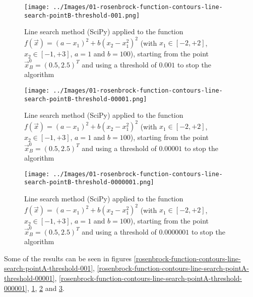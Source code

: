         \begin{figure}
            \centering
            \texttt{[image: ../Images/01-rosenbrock-function-contours-line-search-pointB-threshold-001.png]}
            \caption{Line search method (SciPy) applied to the function \(f(\vec{x}) = (a - x_1)^2 + b(x_2 - x_1^2)^2\) (with \(x_1 \in [-2, +2]\), \(x_2 \in [-1, +3]\), \(a=1\) and \(b=100\)), starting from the point \(\vec{x}_B^0 = (0.5, 2.5)^T\) and using a threshold of \(0.001\) to stop the algorithm}
            \label{rosenbrock-function-contours-line-search-pointB-threshold-001}
        \end{figure}
        \begin{figure}
            \centering
            \texttt{[image: ../Images/01-rosenbrock-function-contours-line-search-pointB-threshold-00001.png]}
            \caption{Line search method (SciPy) applied to the function \(f(\vec{x}) = (a - x_1)^2 + b(x_2 - x_1^2)^2\) (with \(x_1 \in [-2, +2]\), \(x_2 \in [-1, +3]\), \(a=1\) and \(b=100\)), starting from the point \(\vec{x}_B^0 = (0.5, 2.5)^T\) and using a threshold of \(0.00001\) to stop the algorithm}
            \label{rosenbrock-function-contours-line-search-pointB-threshold-00001}
        \end{figure}
        \begin{figure}
            \centering
            \texttt{[image: ../Images/01-rosenbrock-function-contours-line-search-pointB-threshold-0000001.png]}
            \caption{Line search method (SciPy) applied to the function \(f(\vec{x}) = (a - x_1)^2 + b(x_2 - x_1^2)^2\) (with \(x_1 \in [-2, +2]\), \(x_2 \in [-1, +3]\), \(a=1\) and \(b=100\)), starting from the point \(\vec{x}_B^0 = (0.5, 2.5)^T\) and using a threshold of \(0.0000001\) to stop the algorithm}
            \label{rosenbrock-function-contours-line-search-pointB-threshold-000001}
        \end{figure}
        Some of the results can be seen in figures \ref{rosenbrock-function-contours-line-search-pointA-threshold-001}, \ref{rosenbrock-function-contours-line-search-pointA-threshold-00001}, \ref{rosenbrock-function-contours-line-search-pointA-threshold-000001}, \ref{rosenbrock-function-contours-line-search-pointB-threshold-001}, \ref{rosenbrock-function-contours-line-search-pointB-threshold-00001} and \ref{rosenbrock-function-contours-line-search-pointB-threshold-000001}.